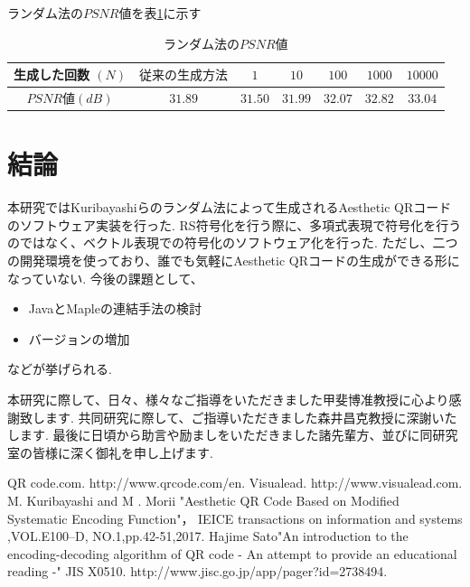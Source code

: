 \documentclass{thesis}
\begin{document}
ランダム法の$PSNR$値を表\ref{tab:PSNR}に示す

\begin{table}[H]
	\caption{ランダム法の$PSNR$値}
	\begin{center}
  		\begin{tabular}{|c|c|c|c|c|c|c|} \hline
     			生成した回数 $(N) $& $従来の生成方法$ & $1$ & $10$ & $100$ & $1000$ & $10000$  \\  \hline
   			$PSNR$値$(dB)$ & $31.89$& $31.50$ & $31.99$ & $32.07$ & $32.82$ & $33.04$\\ \hline
     		\end{tabular}
  	\end{center}
  \label{tab:PSNR}
\end{table}


\chapter{結論}

本研究ではKuribayashiらのランダム法によって生成されるAesthetic QRコードのソフトウェア実装を行った.
RS符号化を行う際に、多項式表現で符号化を行うのではなく、ベクトル表現での符号化のソフトウェア化を行った.
ただし、二つの開発環境を使っており、誰でも気軽にAesthetic QRコードの生成ができる形になっていない.
今後の課題として、
\begin{itemize}
\setlength{\itemsep}{5mm}
 \item JavaとMapleの連結手法の検討
 \item バージョンの増加
 \end{itemize}
などが挙げられる.


\acknowledgement

本研究に際して、日々、様々なご指導をいただきました甲斐博准教授に心より感謝致します.
共同研究に際して、ご指導いただきました森井昌克教授に深謝いたします.
最後に日頃から助言や励ましをいただきました諸先輩方、並びに同研究室の皆様に深く御礼を申し上げます.


\begin{thebibliography}{99}

%
QR code.com. http://www.qrcode.com/en.
%
Visualead. http://www.visualead.com.
%
M. Kuribayashi and M . Morii "Aesthetic QR Code Based on Modified Systematic Encoding Function"，
IEICE transactions on information and systems ,VOL.E100–D, NO.1,pp.42-51,2017.
%
Hajime Sato"An introduction to the encoding-decoding algorithm of QR code - An attempt to provide an educational reading -"
%
JIS X0510. http://www.jisc.go.jp/app/pager?id=2738494. 
\end{thebibliography}
\end{document}
